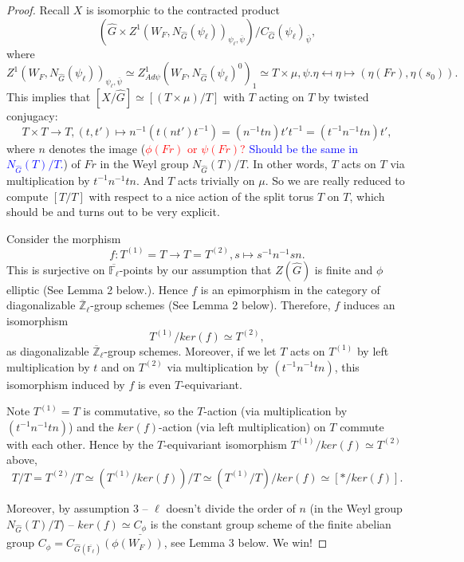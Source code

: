 \documentclass{article}
\newcommand{\red}[1]{\textcolor{red}{#1}}
\newcommand{\blue}[1]{\textcolor{blue}{#1}}
\begin{document}
	\begin{proof}
		Recall $X$ is isomorphic to the contracted product 
		$$(\hat{G} \times Z^1(W_F, N_{\hat{G}}(\psi_{\ell}))_{\psi_{\ell}, \overline{\psi}})/C_{\hat{G}}(\psi_{\ell})_{\overline{\psi}},$$ 
		where
		$$Z^1(W_F, N_{\hat{G}}(\psi_{\ell}))_{\psi_{\ell}, \overline{\psi}} \simeq Z^1_{Ad\psi}(W_F, N_{\hat{G}}(\psi_{\ell})^0)_1 \simeq T \times \mu, \psi.\eta \mapsfrom \eta \mapsto (\eta(Fr), \eta(s_0)).$$
		This implies that $[X/\hat{G}] \simeq [(T \times \mu)/T]$ with $T$ acting on $T$ by twisted conjugacy:
		$$T \times T \to T, (t, t') \mapsto n^{-1}(t(nt')t^{-1})=(n^{-1}tn)t't^{-1}=(t^{-1}n^{-1}tn)t',$$ where $n$ denotes the image (\red{$\phi(Fr)$ or $\psi(Fr)$?} \blue{Should be the same in $N_{\hat{G}}(T)/T$.})
		of $Fr$ in the Weyl group $N_{\hat{G}}(T)/T$.
		In other words, $T$ acts on $T$ via multiplication by $t^{-1}n^{-1}tn$. And $T$ acts trivially on $\mu$. So we are really reduced to compute $[T/T]$ with respect to a nice action of the split torus $T$ on $T$, which should be and turns out to be very explicit.
		
		Consider the morphism
		$$f: T^{(1)}=T \to T=T^{(2)}, s \mapsto s^{-1}n^{-1}sn.$$
		This is surjective on $\overline{\mathbb{F}_{\ell}}$-points by our assumption that $Z(\hat{G})$ is finite and $\phi$ elliptic (See Lemma 2 %
		below.). Hence $f$ is an epimorphism in the category of diagonalizable $\overline{\mathbb{Z}}_{\ell}$-group schemes (See Lemma 2 %
		below). Therefore, $f$ induces an isomorphism 
		$$T^{(1)}/ker(f) \simeq T^{(2)},$$
		as diagonalizable $\overline{\mathbb{Z}}_{\ell}$-group schemes. Moreover, if we let $T$ acts on $T^{(1)}$ by left multiplication by $t$ and on $T^{(2)}$ via multiplication by $(t^{-1}n^{-1}tn)$, this isomorphism induced by $f$ is even $T$-equivariant.
		
		Note $T^{(1)}=T$ is commutative, so the $T$-action (via multiplication by $(t^{-1}n^{-1}tn)$) and the $ker(f)$-action (via left multiplication) on $T$ commute with each other. Hence by the $T$-equivariant isomorphism $T^{(1)}/ker(f) \simeq T^{(2)}$ above,
		$$T/T = T^{(2)}/T \simeq (T^{(1)}/ker(f))/T \simeq (T^{(1)}/T)/ker(f) \simeq [*/ker(f)].$$ 
		
		Moreover, by assumption 3 --  $\ell$ doesn't divide the order of $n$ (in the Weyl group $N_{\hat{G}}(T)/T$) -- $ker(f) \simeq \underline{C_{\phi}}$ is the constant group scheme of the finite abelian group $C_{\phi}=C_{\hat{G}(\overline{\mathbb{F}_{\ell}})}(\phi(W_F))$, see Lemma 3 below. %
		We win!
	\end{proof}
	
\end{document}
